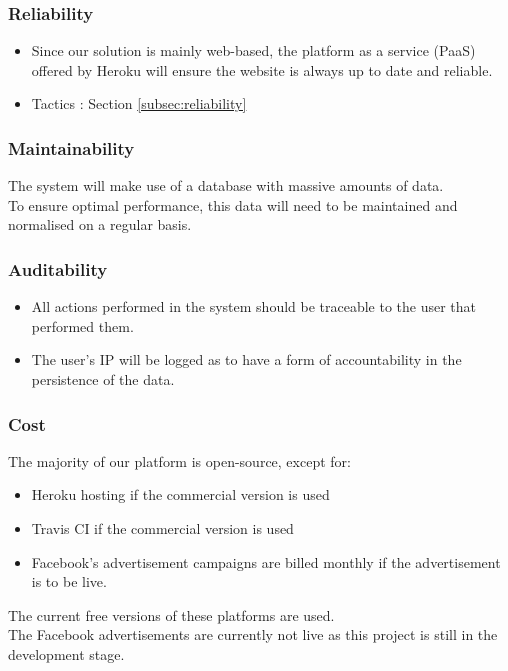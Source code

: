 \documentclass{article}
\begin{document}
		\subsubsection{Reliability}
		\begin{itemize}
			\item Since our solution is mainly web-based, the platform as a service (PaaS) offered by Heroku will ensure the website is always up to date and reliable.
			\item Tactics : Section \ref{subsec:reliability}
		\end{itemize}

		\subsubsection{Maintainability}
			The system will make use of a database with massive amounts of data.\\ To ensure optimal performance, this data will need to be maintained and normalised on a regular basis.

		\subsubsection{Auditability}
		\begin{itemize}
			\item All actions performed in the system should be traceable to the user that performed them.
			\item The user's IP  will be logged as to have a form of accountability in the persistence of the data.
		\end{itemize}

		\subsubsection{Cost}
		The majority of our platform is open-source, except for:
		\begin{itemize}
			\item Heroku hosting if the commercial version is used
			\item Travis CI if the commercial version is used
			\item Facebook's advertisement campaigns are billed monthly if the advertisement is to be live.
		\end{itemize}
		The current free versions of these platforms are used. \\
		The Facebook advertisements are currently not live as this project is still in the development stage.
\end{document}
